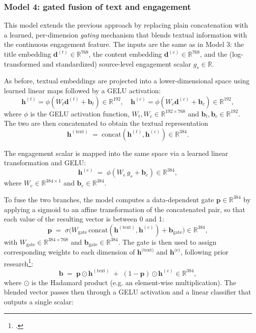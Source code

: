 \documentclass[a4paper,twoside,12pt]{book}
\begin{document}
\subsubsection*{Model 4: gated fusion of text and engagement}

This model extends the previous approach by replacing plain concatenation with a learned, per-dimension \emph{gating} mechanism that blends textual information with the continuous engagement feature. The inputs are the same as in Model 3: the title embedding $\mathbf{d}^{(t)} \in \mathbb{R}^{768}$, the content embedding $\mathbf{d}^{(c)} \in \mathbb{R}^{768}$, and the (log-transformed and standardized) source-level engagement scalar $g_s \in \mathbb{R}$.

As before, textual embeddings are projected into a lower-dimensional space using learned linear maps followed by a GELU activation:
\[
\mathbf{h}^{(t)} = \phi\left(W_t \mathbf{d}^{(t)} + \mathbf{b}_t \right) \in \mathbb{R}^{192}, \quad
\mathbf{h}^{(c)} = \phi\left(W_c \mathbf{d}^{(c)} + \mathbf{b}_c \right) \in \mathbb{R}^{192},
\]
where $\phi$ is the GELU activation function,  $W_t, W_c \in \mathbb{R}^{192\times 768}$ and $\mathbf{b}_t, \mathbf{b}_c \in \mathbb{R}^{192}$. The two are then concatenated to obtain the textual representation
\[
\mathbf{h}^{(\text{text})} \;=\; \text{concat}(\mathbf{h}^{(t)}, \mathbf{h}^{(c)}) \in \mathbb{R}^{384}.
\]

The engagement scalar is mapped into the same space via a learned linear transformation and GELU:
\[
\mathbf{h}^{(e)} \;=\; \phi(W_e \, g_s + \mathbf{b}_e) \in \mathbb{R}^{384},
\]
where $W_e \in \mathbb{R}^{384 \times 1}$ and $\mathbf{b}_e \in \mathbb{R}^{384}$.

To fuse the two branches, the model computes a data-dependent gate $\mathbf{p}\in\mathbb{R}^{384}$ by applying a sigmoid to an affine transformation of the concatenated pair, so that each value of the resulting vector is between 0 and 1:
\[
\mathbf{p} \;=\; \sigma\!\big(W_{\text{gate}} \,\text{concat}(\mathbf{h}^{(\text{text})}, \mathbf{h}^{(e)}) + \mathbf{b}_{\text{gate}}\big) \in \mathbb{R}^{384},
\]
with $W_{\text{gate}} \in \mathbb{R}^{384 \times 768}$ and $\mathbf{b}_{\text{gate}} \in \mathbb{R}^{384}$. The gate is then used to assign corresponding weights to each dimension of $\mathbf{h}^{\text{(text)}}$ and $\mathbf{h}^{\text{(e)}}$, following prior research\footcite{arevalo2017}:
\[
\mathbf{b} \;=\; \mathbf{p} \odot \mathbf{h}^{(\text{text})} \;+\; (1-\mathbf{p}) \odot \mathbf{h}^{(e)} \in \mathbb{R}^{384},
\]
where $\odot$ is the Hadamard product (e.g. an element-wise multiplication). The blended vector passes then through a GELU activation and a linear classifier that outputs a single scalar:
\end{document}
